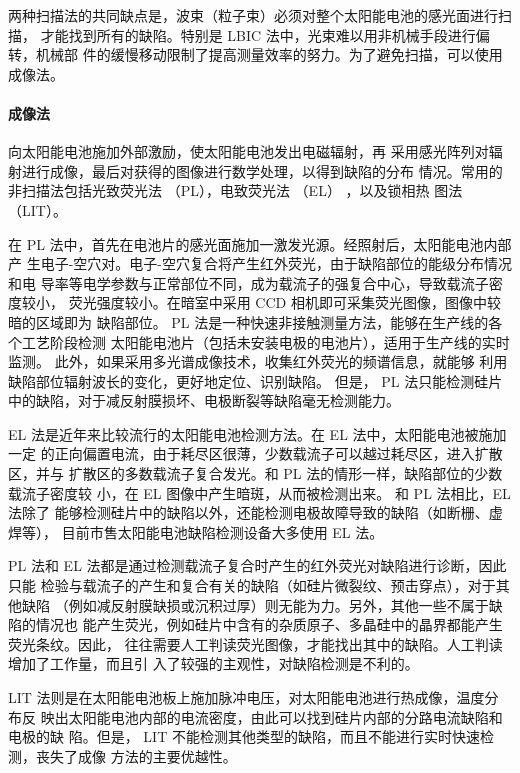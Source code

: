 两种扫描法的共同缺点是，波束（粒子束）必须对整个太阳能电池的感光面进行扫描，
才能找到所有的缺陷。特别是 LBIC 法中，光束难以用非机械手段进行偏转，机械部
件的缓慢移动限制了提高测量效率的努力。为了避免扫描，可以使用成像法。

\paragraph{成像法} 向太阳能电池施加外部激励，使太阳能电池发出电磁辐射，再
采用感光阵列对辐射进行成像，最后对获得的图像进行数学处理，以得到缺陷的分布
情况。常用的非扫描法包括光致荧光法 （PL），电致荧光法 （EL） ，以及锁相热
图法（LIT）。

在 PL 法中，首先在电池片的感光面施加一激发光源。经照射后，太阳能电池内部产
生电子-空穴对。电子-空穴复合将产生红外荧光，由于缺陷部位的能级分布情况和电
导率等电学参数与正常部位不同，成为载流子的强复合中心，导致载流子密度较小，
荧光强度较小。在暗室中采用 CCD 相机即可采集荧光图像，图像中较暗的区域即为
缺陷部位。 PL 法是一种快速非接触测量方法，能够在生产线的各个工艺阶段检测
太阳能电池片（包括未安装电极的电池片），适用于生产线的实时监测。
\cite{FastPL} 此外，如果采用多光谱成像技术，收集红外荧光的频谱信息，就能够
利用缺陷部位辐射波长的变化，更好地定位、识别缺陷。\cite{SpectrePL} 但是，
PL 法只能检测硅片中的缺陷，对于减反射膜损坏、电极断裂等缺陷毫无检测能力。

EL 法是近年来比较流行的太阳能电池检测方法。在 EL 法中，太阳能电池被施加一定
的正向偏置电流，由于耗尽区很薄，少数载流子可以越过耗尽区，进入扩散区，并与
扩散区的多数载流子复合发光。和 PL 法的情形一样，缺陷部位的少数载流子密度较
小，在 EL 图像中产生暗斑，从而被检测出来。\cite{EL} 和 PL 法相比，EL 法除了
能够检测硅片中的缺陷以外，还能检测电极故障导致的缺陷（如断栅、虚焊等），
目前市售太阳能电池缺陷检测设备大多使用 EL 法。

PL 法和 EL 法都是通过检测载流子复合时产生的红外荧光对缺陷进行诊断，因此只能
检验与载流子的产生和复合有关的缺陷（如硅片微裂纹、预击穿点），对于其他缺陷
（例如减反射膜缺损或沉积过厚）则无能为力。另外，其他一些不属于缺陷的情况也
能产生荧光，例如硅片中含有的杂质原子、多晶硅中的晶界都能产生荧光条纹。因此，
往往需要人工判读荧光图像，才能找出其中的缺陷。人工判读增加了工作量，而且引
入了较强的主观性，对缺陷检测是不利的。

LIT 法则是在太阳能电池板上施加脉冲电压，对太阳能电池进行热成像，温度分布反
映出太阳能电池内部的电流密度，由此可以找到硅片内部的分路电流缺陷和电极的缺
陷。但是， LIT 不能检测其他类型的缺陷，而且不能进行实时快速检测，丧失了成像
方法的主要优越性。


